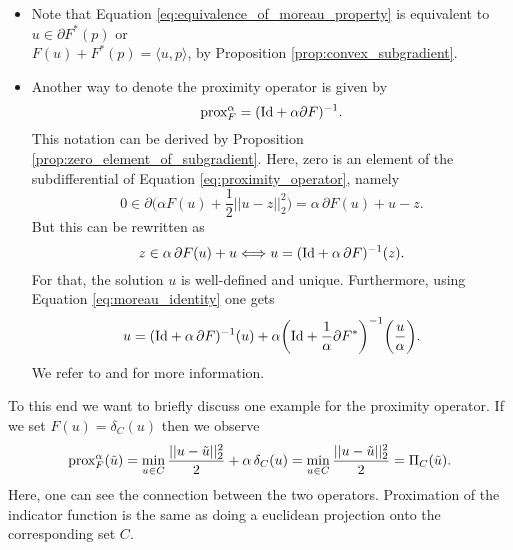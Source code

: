     \begin{remark}
        \begin{itemize}
            \item Note that Equation \ref{eq:equivalence_of_moreau_property} is equivalent to $u \in \partial F^{\ast}(p)$ or\\
            $F(u) + F^{\ast}(p) = \langle u, p \rangle$, by Proposition \ref{prop:convex_subgradient}.
            \item Another way to denote the proximity operator is given by
                \begin{equation}
                    \textnormal{prox}^{\alpha}_{F} = (\textnormal{Id} + \alpha \partial F)^{-1}.
                    \label{eq:proximity_operator_reloaded}
                \end{equation}
            This notation can be derived by Proposition \ref{prop:zero_element_of_subgradient}. Here, zero is an element of the subdifferential of Equation \ref{eq:proximity_operator}, namely
                $$
                    0 \in \partial \big( \alpha F(u) + \frac{1}{2} ||u - z||_{2}^{2} \big) = \alpha \, \partial F(u) + u - z.
                $$
            But this can be rewritten as
                $$
                    z \in \alpha\,\partial F(u) + u \Longleftrightarrow u = (\textnormal{Id} + \alpha \, \partial F)^{-1}(z).
                $$
            For that, the solution $u$ is well-defined and unique. Furthermore, using Equation \ref{eq:moreau_identity} one gets
                \begin{equation}
                    u = (\textnormal{Id} + \alpha \, \partial F)^{-1}(u) + \alpha \bigg( \textnormal{Id} + \frac{1}{\alpha} \partial F^{\ast} \bigg)^{-1} \bigg(\frac{u}{\alpha}\bigg).
                    \label{eq:moreau_identity_reloaded}
                \end{equation}
            We refer to \cite{Rockafellar} and \cite{Chambolle-et-al-10} for more information.
        \end{itemize}
    \end{remark}

    \begin{example}
        To this end we want to briefly discuss one example for the proximity operator. If we set $F(u) = \delta_{C}(u)$ then we observe
            $$
                \textnormal{prox}^{\alpha}_{F}(\tilde{u}) = \min\limits_{u \in C} \frac{||u - \tilde{u}||_{2}^{2}}{2} + \alpha \, \delta_{C}(u) = \min\limits_{u \in C} \frac{||u - \tilde{u}||_{2}^{2}}{2} = \Pi_{C}(\tilde{u}).
            $$
        Here, one can see the connection between the two operators. Proximation of the indicator function is the same as doing a euclidean projection onto the corresponding set $C$.
    \label{ex:proximity_operator}
    \end{example}

